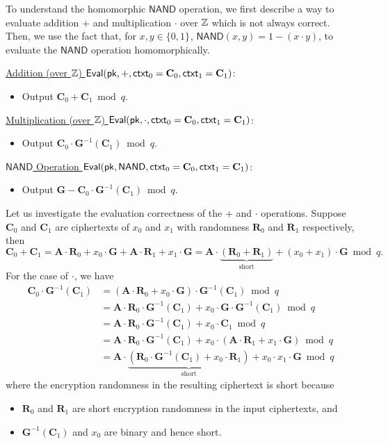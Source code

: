 \documentclass[10pt,twoside]{article}
\newcommand{\ctxt}{\mathsf{ctxt}}
\newcommand{\bits}[1][]{\{0,1\}^{#1}}
\newcommand{\mat}[1]{\mathbf{#1}}
\renewcommand{\NAND}{\mathsf{NAND}}
\begin{document}
To understand the homomorphic $\NAND$ operation, we first describe a way to evaluate addition $+$ and multiplication $\cdot$ over $\mathbb{Z}$ which is not always correct. 
Then, we use the fact that, for $x,y \in \bits$, $\NAND(x,y) = 1 - (x \cdot y)$, to evaluate the $\NAND$ operation homomorphically. 

\noindent\underline{Addition (over $\mathbb{Z}$) $\eval(\pk, +, \ctxt_0 = \mat{C}_0, \ctxt_1 = \mat{C}_1)$}:
\begin{itemize}
    \item Output $\mat{C}_0 + \mat{C}_1 \bmod q$.
\end{itemize}

\noindent\underline{Multiplication (over $\mathbb{Z}$) $\eval(\pk, \cdot, \ctxt_0 = \mat{C}_0, \ctxt_1 = \mat{C}_1)$}:
\begin{itemize}
    \item Output $\mat{C}_0 \cdot \mat{G}^{-1}(\mat{C}_1) \bmod q$.
\end{itemize}

\noindent\underline{$\NAND$ Operation $\eval(\pk, \NAND, \ctxt_0 = \mat{C}_0, \ctxt_1 = \mat{C}_1)$}:
\begin{itemize}
    \item Output $\mat{G} - \mat{C}_0 \cdot \mat{G}^{-1}(\mat{C}_1) \bmod q$.
\end{itemize}

Let us investigate the evaluation correctness of the $+$ and $\cdot$ operations. 
Suppose $\mat{C}_0$ and $\mat{C}_1$ are ciphertexts of $x_0$ and $x_1$ with randomness $\mat{R}_0$ and $\mat{R}_1$ respectively, then
\[
    \mat{C}_0 + \mat{C}_1 = \mat{A} \cdot \mat{R}_0 + x_0 \cdot \mat{G} + \mat{A} \cdot \mat{R}_1 + x_1 \cdot \mat{G} = \mat{A} \cdot \underbrace{(\mat{R}_0 + \mat{R}_1)}_{\text{short}} + (x_0 + x_1) \cdot \mat{G} \bmod q.
\]
For the case of $\cdot$, we have
\begin{align*}
    \mat{C}_0 \cdot \mat{G}^{-1}(\mat{C}_1)
    &= (\mat{A} \cdot \mat{R}_0 + x_0 \cdot \mat{G}) \cdot \mat{G}^{-1}(\mat{C}_1) \bmod q \\
    &= \mat{A} \cdot \mat{R}_0 \cdot \mat{G}^{-1}(\mat{C}_1) + x_0 \cdot \mat{G} \cdot \mat{G}^{-1}(\mat{C}_1) \bmod q \\
    &= \mat{A} \cdot \mat{R}_0 \cdot \mat{G}^{-1}(\mat{C}_1) + x_0 \cdot \mat{C}_1 \bmod q \\
    &= \mat{A} \cdot \mat{R}_0 \cdot \mat{G}^{-1}(\mat{C}_1) + x_0 \cdot (\mat{A} \cdot \mat{R}_1 + x_1 \cdot \mat{G}) \bmod q \\
    &= \mat{A} \cdot \underbrace{(\mat{R}_0 \cdot \mat{G}^{-1}(\mat{C}_1) + x_0 \cdot \mat{R}_1)}_{\text{short}} + x_0 \cdot x_1 \cdot \mat{G} \bmod q
\end{align*}
where the encryption randomness in the resulting ciphertext is short because
\begin{itemize}
    \item $\mat{R}_0$ and $\mat{R}_1$ are short encryption randomness in the input ciphertexts, and
    \item $\mat{G}^{-1}(\mat{C}_1)$ and $x_0$ are binary and hence short.
\end{itemize}
\end{document}
